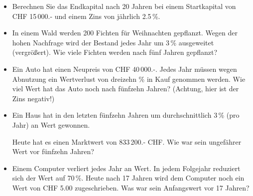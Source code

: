 \begin{itemize}
  \item Berechnen Sie das Endkapital nach 20 Jahren bei einem
  Startkapital von CHF 15\,000.- und einem Zins von jährlich
  2.5\,\%.\\%

\item In einem Wald werden 200 Fichten für Weihnachten
  gepflanzt. Wegen der hohen Nachfrage wird der Bestand jedes Jahr um
  3\,\% ausgeweitet (vergrößert).
  Wie viele Fichten werden nach fünf Jahren gepflanzt?




\item Ein Auto hat einen Neupreis von CHF 40\,000.-. Jedes Jahr müssen
wegen Abnutzung ein Wertverlust von dreizehn \% in Kauf
  genommen werden. Wie viel Wert hat das Auto noch nach fünfzehn Jahren? (Achtung, hier ist der Zins negativ!)


\newpage
\item Ein Haus hat in den letzten fünfzehn Jahren um durchschnittlich 3\,\% (pro Jahr) an Wert gewonnen.

Heute hat es einen Marktwert
  von 833\,200.- CHF. Wie  war sein ungefährer Wert vor fünfzehn Jahren?

\item Einem Computer verliert jedes Jahr an Wert. In jedem Folgejahr
reduziert sich der Wert auf 70\,\%. Heute nach 17 Jahren wird dem
Computer noch ein Wert von CHF 5.00 zugeschrieben. Was war sein
Anfangswert vor 17 Jahren?
\end{itemize}

\newpage

